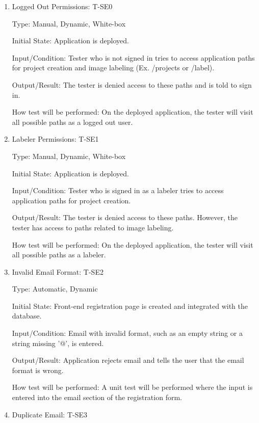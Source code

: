 \documentclass[12pt, titlepage]{article}
\begin{document}
\begin{enumerate}

\item{Logged Out Permissions: T-SE0\\}

Type: Manual, Dynamic, White-box
					
Initial State: Application is deployed.
					
Input/Condition: Tester who is not signed in tries to access application paths for project creation and image labeling (Ex. /projects or /label).
					
Output/Result: The tester is denied access to these paths and is told to sign in.
					
How test will be performed: On the deployed application, the tester will visit all possible paths as a logged out user.

\item{Labeler Permissions: T-SE1\\}

Type: Manual, Dynamic, White-box
					
Initial State: Application is deployed.
					
Input/Condition: Tester who is signed in as a labeler tries to access application paths for project creation.
					
Output/Result: The tester is denied access to these paths. However, the tester has access to paths related to image labeling.
					
How test will be performed: On the deployed application, the tester will visit all possible paths as a labeler.

\item{Invalid Email Format: T-SE2\\}

Type: Automatic, Dynamic
					
Initial State: Front-end registration page is created and integrated with the database.
					
Input/Condition: Email with invalid format, such as an empty string or a string missing '@', is entered.
					
Output/Result: Application rejects email and tells the user that the email format is wrong.
					
How test will be performed: A unit test will be performed where the input is entered into the email section of the registration form.

\item{Duplicate Email: T-SE3\\}


\end{enumerate}
\end{document}
